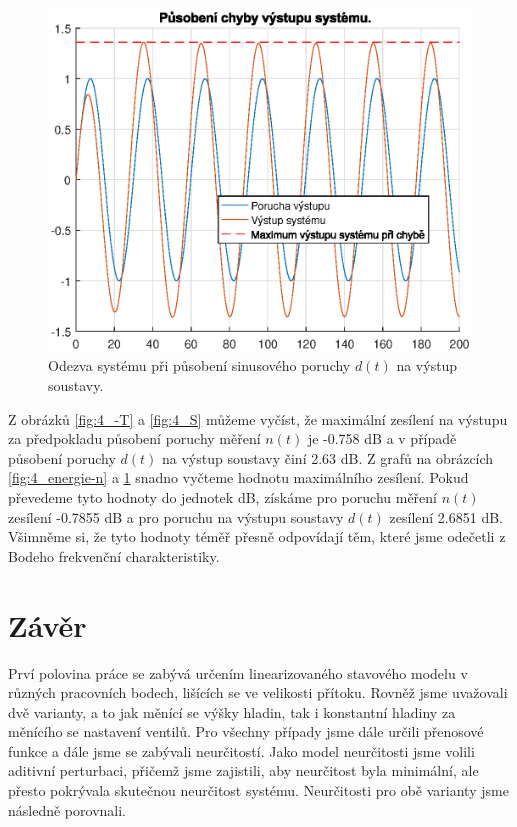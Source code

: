 \documentclass[a4paper,11pt]{article}
\begin{document}
\begin{figure}[htbp]
	\begin{center}
	\includegraphics[scale = 1.0]{obrazky/dS.eps}
	\caption{Odezva systému při působení sinusového poruchy $ d\left ( t \right ) $ na výstup soustavy.}
	\label{fig:4_energie-d}
	\end{center}
\end{figure}

Z obrázků \ref{fig:4_-T} a \ref{fig:4_S} můžeme vyčíst, že maximální zesílení na výstupu za předpokladu působení poruchy měření $ n\left ( t \right ) $ je -0.758 dB a v případě působení poruchy $ d\left ( t \right ) $ na výstup soustavy činí 2.63 dB. Z grafů na obrázcích \ref{fig:4_energie-n} a \ref{fig:4_energie-d} snadno vyčteme hodnotu maximálního zesílení. Pokud převedeme tyto hodnoty do jednotek dB, získáme pro poruchu měření $ n\left ( t \right ) $ zesílení -0.7855 dB a pro poruchu na výstupu soustavy $ d\left ( t \right ) $ zesílení  2.6851 dB. Všimněme si, že tyto hodnoty téměř přesně odpovídají těm, které jsme odečetli z Bodeho frekvenční charakteristiky.



\newpage 
\section{Závěr}
Prví polovina práce se zabývá určením linearizovaného stavového modelu v různých pracovních bodech, lišících se ve velikosti přítoku. Rovněž jsme uvažovali dvě varianty, a to jak měnící se výšky hladin, tak i konstantní hladiny za měnícího se nastavení ventilů. Pro všechny případy jsme dále určili přenosové funkce a dále jsme se zabývali neurčitostí. Jako model neurčitosti jsme volili aditivní perturbaci, přičemž jsme zajistili, aby neurčitost byla minimální, ale přesto pokrývala skutečnou neurčitost systému. Neurčitosti pro obě varianty jsme následně porovnali.
\end{document}
